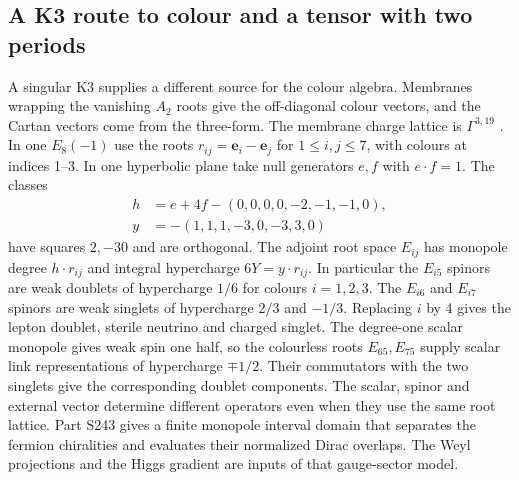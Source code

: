 \documentclass[aps,prd,reprint,onecolumn,nofootinbib,amsmath,amssymb]{revtex4-2}
\begin{document}
\subsection{A K3 route to colour and a tensor with two periods}
A singular K3 supplies a different source for the colour algebra. Membranes wrapping the vanishing $A_2$ roots give the off-diagonal colour vectors, and the Cartan vectors come from the three-form. The membrane charge lattice is $\Gamma^{3,19}$ \cite{HullTownsend1995Enhanced}. In one $E_8(-1)$ use the roots $r_{ij}=\mathbf e_i-\mathbf e_j$ for $1\leq i,j\leq7$, with colours at indices 1--3. In one hyperbolic plane take null generators $e,f$ with $e\cdot f=1$. The classes
\begin{equation}
 \begin{split}
 h&=e+4f-(0,0,0,0,-2,-1,-1,0),\\
 y&=-(1,1,1,-3,0,-3,3,0)
 \end{split}
\end{equation}
have squares $2,-30$ and are orthogonal. The adjoint root space $E_{ij}$ has monopole degree $h\cdot r_{ij}$ and integral hypercharge $6Y=y\cdot r_{ij}$. In particular the $E_{i5}$ spinors are weak doublets of hypercharge $1/6$ for colours $i=1,2,3$. The $E_{i6}$ and $E_{i7}$ spinors are weak singlets of hypercharge $2/3$ and $-1/3$. Replacing $i$ by 4 gives the lepton doublet, sterile neutrino and charged singlet. The degree-one scalar monopole gives weak spin one half, so the colourless roots $E_{65},E_{75}$ supply scalar link representations of hypercharge $\mp1/2$. Their commutators with the two singlets give the corresponding doublet components. The scalar, spinor and external vector determine different operators even when they use the same root lattice. Part S243 gives a finite monopole interval domain that separates the fermion chiralities and evaluates their normalized Dirac overlaps. The Weyl projections and the Higgs gradient are inputs of that gauge-sector model.
\end{document}
